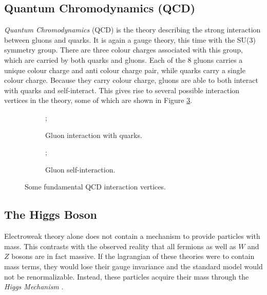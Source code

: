 \subsection{Quantum Chromodynamics (QCD)}
\textit{Quantum Chromodynamics} (QCD) \cite{pdg_rev,black_book} is the theory describing the strong interaction between gluons and quarks. It is again a gauge theory, this time with the SU(3) symmetry group. There are three colour charges associated with this group, which are carried by both quarks and gluons. Each of the 8 gluons carries a unique colour charge and anti colour charge pair, while quarks carry a single colour charge. Because they carry colour charge, gluons are able to both interact with quarks and self-interact. This gives rise to several possible interaction vertices in the theory, some of which are shown in Figure \ref{fig:QCDVertices}.

\begin{figure}[H]
    \begin{subfigure}{.5\textwidth}
        \centering
        ;
        \caption{Gluon interaction with quarks.}
        \label{fig:QCDvertexa}
    \end{subfigure}
    \begin{subfigure}{.5\textwidth}
        \centering
        ;
        \caption{Gluon self-interaction.}
        \label{fig:QCDVertexb}
    \end{subfigure}
    \caption{Some fundamental QCD interaction vertices.}
    \label{fig:QCDVertices}
\end{figure}

\subsection{The Higgs Boson}
Electroweak theory alone does not contain a mechanism to provide particles with mass. This contrasts with the observed reality that all fermions as well as $W$ and $Z$ bosons are in fact massive. If the lagrangian of these theories were to contain mass terms, they would lose their gauge invariance and the standard model would not be renormalizable. Instead, these particles acquire their mass through the \textit{Higgs Mechanism} \cite{Englert, Higgs1, Higgs2}.

